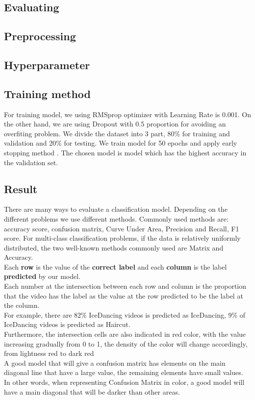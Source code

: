 \subsection{Evaluating}

\subsection{Preprocessing}

\subsection{Hyperparameter}

\subsection{Training method}
For training model, we using RMSprop optimizer \cite{} with Learning Rate is 0.001. On the other hand, we are using Dropout with 0.5 proportion for avoiding an overfiting problem. We divide the dataset into 3 part, 80\% for training and validation and 20\% for testing. We train model for 50 epochs and apply early stopping method \cite{}. The chosen model is model which has the highest accuracy in the validation set.  

\subsection{Result}
There are many ways to evaluate a classification model. Depending on the different problems we use different methods. Commonly used methods are: accuracy score, confusion matrix, Curve Under Area, Precision and Recall, F1 score. For multi-class classification problems, if the data is relatively uniformly distributed, the two well-known methods commonly used are Matrix and Accuracy.\\
Each \textbf{row} is the value of the \textbf{correct label} and each \textbf{column} is the label \textbf{predicted} by our model.\\
Each number at the intersection between each row and column is the proportion that the video has the label as the value at the row predicted to be the label at the column.\\
For example, there are 82\% IceDancing videos is predicted as IceDancing, 9\% of IceDancing videos is predicted as Haircut.\\
Furthermore, the intersection cells are also indicated in red color, with the value increasing gradually from 0 to 1, the density of the color will change accordingly, from lightness red to dark red\\
A good model that will give a confusion matrix has elements on the main diagonal line that have a large value, the remaining elements have small values. In other words, when representing Confusion Matrix in color, a good model will have a main diagonal that will be darker than other areas.



